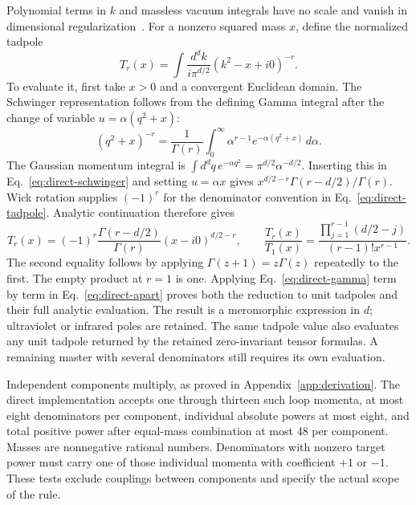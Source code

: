 Polynomial terms in $k$ and massless vacuum integrals have no scale and vanish in dimensional regularization~\cite{Weinzierl2022}. For a nonzero squared mass $x$, define the normalized tadpole
\begin{equation}
 T_r(x)=\int\frac{d^dk}{i\pi^{d/2}}(k^2-x+i0)^{-r}.
 \label{eq:direct-tadpole}
\end{equation}
To evaluate it, first take $x>0$ and a convergent Euclidean domain. The Schwinger representation follows from the defining Gamma integral after the change of variable $u=\alpha(q^2+x)$:
\begin{equation}
 (q^2+x)^{-r}=\frac{1}{\Gamma(r)}\int_0^\infty
 \alpha^{r-1}e^{-\alpha(q^2+x)}\,d\alpha.
 \label{eq:direct-schwinger}
\end{equation}
The Gaussian momentum integral is $\int d^dq\,e^{-\alpha q^2}=\pi^{d/2}\alpha^{-d/2}$. Inserting this in Eq.~\eqref{eq:direct-schwinger} and setting $u=\alpha x$ gives $x^{d/2-r}\Gamma(r-d/2)/\Gamma(r)$. Wick rotation supplies $(-1)^r$ for the denominator convention in Eq.~\eqref{eq:direct-tadpole}. Analytic continuation therefore gives
\begin{equation}
 T_r(x)=(-1)^r\frac{\Gamma(r-d/2)}{\Gamma(r)}(x-i0)^{d/2-r},\qquad
 \frac{T_r(x)}{T_1(x)}=
 \frac{\prod_{j=1}^{r-1}(d/2-j)}{(r-1)!x^{r-1}}.
 \label{eq:direct-gamma}
\end{equation}
The second equality follows by applying $\Gamma(z+1)=z\Gamma(z)$ repeatedly to the first. The empty product at $r=1$ is one. Applying Eq.~\eqref{eq:direct-gamma} term by term in Eq.~\eqref{eq:direct-apart} proves both the reduction to unit tadpoles and their full analytic evaluation. The result is a meromorphic expression in $d$; ultraviolet or infrared poles are retained. The same tadpole value also evaluates any unit tadpole returned by the retained zero-invariant tensor formulas. A remaining master with several denominators still requires its own evaluation.

Independent components multiply, as proved in Appendix~\ref{app:derivation}. The direct implementation accepts one through thirteen such loop momenta, at most eight denominators per component, individual absolute powers at most eight, and total positive power after equal-mass combination at most 48 per component. Masses are nonnegative rational numbers. Denominators with nonzero target power must carry one of those individual momenta with coefficient $+1$ or $-1$. These tests exclude couplings between components and specify the actual scope of the rule.

